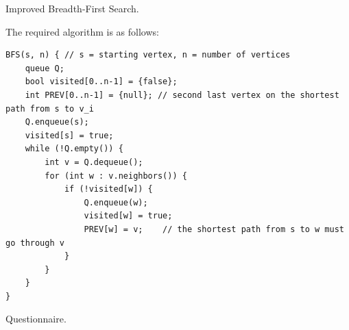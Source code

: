 \documentclass[answers]{exam}
\begin{document}
\begin{questions}
    \question[20] Improved Breadth-First Search.
    \begin{solution}
        The required algorithm is as follows:
        \begin{verbatim}
BFS(s, n) { // s = starting vertex, n = number of vertices
    queue Q;
    bool visited[0..n-1] = {false};
    int PREV[0..n-1] = {null}; // second last vertex on the shortest path from s to v_i
    Q.enqueue(s);
    visited[s] = true;
    while (!Q.empty()) {
        int v = Q.dequeue();
        for (int w : v.neighbors()) {
            if (!visited[w]) {
                Q.enqueue(w);
                visited[w] = true;
                PREV[w] = v;    // the shortest path from s to w must go through v
            }
        }
    }
}
        \end{verbatim}
    \end{solution}

    \question[5] Questionnaire.
    \begin{solution}
    \end{solution}

\end{questions}
\end{document}
